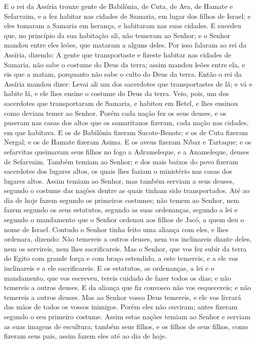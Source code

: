 E o rei da Assíria trouxe gente de Babilônia, de Cuta, de Ava, de
Hamate e Sefarvaim, e a fez habitar nas cidades de Samaria, em lugar
dos filhos de Israel; e eles tomaram a Samaria em herança, e
habitaram nas suas cidades. E sucedeu que, no princípio da
sua habitação ali, não temeram ao Senhor; e o Senhor mandou entre
eles leões, que mataram a alguns deles. Por isso falaram ao
rei da Assíria, dizendo: A gente que transportaste e fizeste habitar
nas cidades de Samaria, não sabe o costume do Deus da terra; assim
mandou leões entre ela, e eis que a matam, porquanto não sabe o
culto do Deus da terra. Então o rei da Assíria mandou dizer:
Levai ali um dos sacerdotes que transportastes de lá; e vá e habite
lá, e ele lhes ensine o costume do Deus da terra. Veio, pois,
um dos sacerdotes que transportaram de Samaria, e habitou em Betel,
e lhes ensinou como deviam temer ao Senhor. Porém cada nação
fez os seus deuses, e os puseram nas casas dos altos que os
samaritanos fizeram, cada nação nas cidades, em que habitava.
E os de Babilônia fizeram Sucote-Benote; e os de Cuta fizeram
Nergal; e os de Hamate fizeram Asima. E os aveus fizeram
Nibaz e Tartaque; e os sefarvitas queimavam seus filhos no fogo a
Adrameleque, e a Anameleque, deuses de Sefarvaim. Também
temiam ao Senhor; e dos mais baixos do povo fizeram sacerdotes dos
lugares altos, os quais lhes faziam o ministério nas casas dos
lugares altos. Assim temiam ao Senhor, mas também serviam a
seus deuses, segundo o costume das nações dentre as quais tinham
sido transportados. Até ao dia de hoje fazem segundo os
primeiros costumes; não temem ao Senhor, nem fazem segundo os seus
estatutos, segundo as suas ordenanças, segundo a lei e segundo o
mandamento que o Senhor ordenou aos filhos de Jacó, a quem deu o
nome de Israel. Contudo o Senhor tinha feito uma aliança com
eles, e lhes ordenara, dizendo: Não temereis a outros deuses, nem
vos inclinareis diante deles, nem os servireis, nem lhes
sacrificareis. Mas o Senhor, que vos fez subir da terra do
Egito com grande força e com braço estendido, a este temereis, e a
ele vos inclinareis e a ele sacrificareis. E os estatutos, as
ordenanças, a lei e o mandamento, que vos escreveu, tereis cuidado
de fazer todos os dias; e não temereis a outros deuses. E da
aliança que fiz convosco não vos esquecereis; e não temereis a
outros deuses. Mas ao Senhor vosso Deus temereis, e ele vos
livrará das mãos de todos os vossos inimigos. Porém eles não
ouviram; antes fizeram segundo o seu primeiro costume. Assim
estas nações temiam ao Senhor e serviam as suas imagens de
escultura; também seus filhos, e os filhos de seus filhos, como
fizeram seus pais, assim fazem eles até ao dia de hoje.

